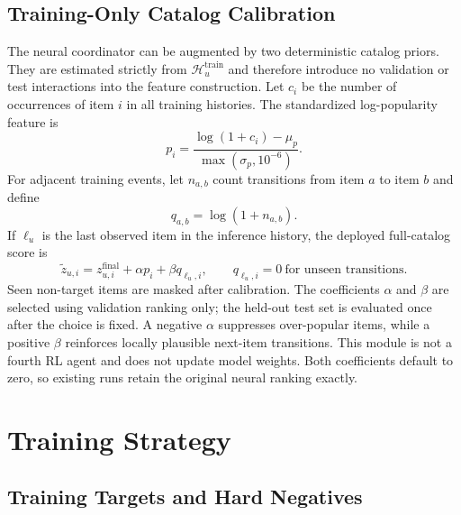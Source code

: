 \documentclass[11pt,a4paper]{article}
\begin{document}
\subsection{Training-Only Catalog Calibration}

The neural coordinator can be augmented by two deterministic catalog priors.
They are estimated strictly from $\mathcal H_u^{\mathrm{train}}$ and therefore
introduce no validation or test interactions into the feature construction.
Let $c_i$ be the number of occurrences of item $i$ in all training histories.
The standardized log-popularity feature is
\begin{equation}
  p_i=
  \frac{\log(1+c_i)-\mu_p}{\max(\sigma_p,10^{-6})}.
\end{equation}
For adjacent training events, let $n_{a,b}$ count transitions from item $a$ to
item $b$ and define
\begin{equation}
  q_{a,b}=\log(1+n_{a,b}).
\end{equation}
If $\ell_u$ is the last observed item in the inference history, the deployed
full-catalog score is
\begin{equation}
  \widetilde z_{u,i}
  =
  z_{u,i}^{\mathrm{final}}
  +\alpha p_i
  +\beta q_{\ell_u,i},
  \qquad q_{\ell_u,i}=0\ \text{for unseen transitions}.
\end{equation}
Seen non-target items are masked after calibration. The coefficients $\alpha$
and $\beta$ are selected using validation ranking only; the held-out test set
is evaluated once after the choice is fixed. A negative $\alpha$ suppresses
over-popular items, while a positive $\beta$ reinforces locally plausible
next-item transitions. This module is not a fourth RL agent and does not update
model weights. Both coefficients default to zero, so existing runs retain the
original neural ranking exactly.

\section{Training Strategy}

\subsection{Training Targets and Hard Negatives}
\end{document}

